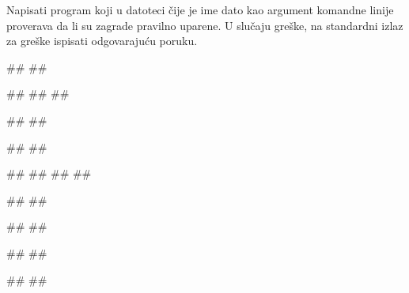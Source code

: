 \begin{Exercise}[label=p3_x2]         
Napisati program koji u datoteci čije je ime dato kao argument komandne linije proverava da li su zagrade pravilno uparene.
U slučaju greške, na standardni izlaz za greške ispisati odgovarajuću poruku.

\begin{minitest}
\begin{upotreba}{1}
#\naslovPokretanje#
##

##
##
##

#\naslovIzlaz#
##
\end{upotreba}
\end{minitest}
\begin{minitest}
\begin{upotreba}{2}
#\naslovPokretanje#
##

##
##
##
##

#\naslovIzlaz#
##
\end{upotreba}
\end{minitest}
\begin{minitest}
\begin{upotreba}{3}
#\naslovPokretanje#
##

##
##

#\naslovIzlaz#
##
\end{upotreba}
\end{minitest}

\end{Exercise}
\begin{Answer}[ref=p3_x2]
\end{Answer}


